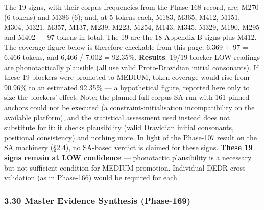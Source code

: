 \documentclass[
]{article}
\begin{document}
The 19 signs, with their corpus frequencies from the Phase-168 record, are: M270 (6 tokens) and M386 (6); and, at 5 tokens each, M183, M365, M412, M151, M304, M321, M357, M137, M239, M223, M254, M143, M345, M329, M190, M295 and M402 --- 97 tokens in total. The 19 are the 18 Appendix-B signs plus M412. The coverage figure below is therefore checkable from this page: 6,369 + 97 = 6,466 tokens, and 6,466 / 7,002 = 92.35\%. \textbf{Results}: 19/19
blocker LOW readings are phonotactically plausible (all use valid
Proto-Dravidian initial consonants). If these 19 blockers were promoted to MEDIUM, token coverage would rise from 90.96\% to an estimated 92.35\% --- a hypothetical figure, reported here only to size the blockers' effect. Note: the planned full-corpus SA run with 161 pinned anchors could not be executed (a constraint-initialisation incompatibility on the available platform), and the statistical assessment used instead does not substitute for it: it checks plausibility (valid Dravidian initial consonants, positional consistency) and nothing more. In light of the Phase-107 result on the SA machinery (§2.4), no SA-based verdict is claimed for these signs. \textbf{These 19
signs remain at LOW confidence} --- phonotactic plausibility is a
necessary but not sufficient condition for MEDIUM promotion. Individual
DEDR cross-validation (as in Phase-166) would be required for each.

\subsubsection{3.30 Master Evidence Synthesis
(Phase-169)}\label{master-evidence-synthesis-phase-169}
\end{document}
